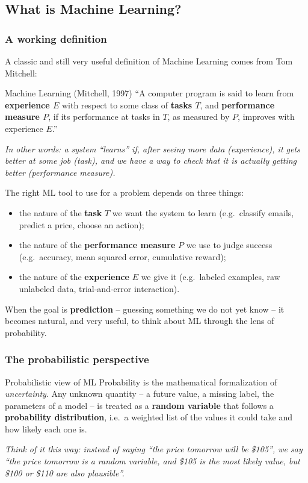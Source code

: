 \subsection{What is Machine Learning?}\label{sec:rl-intro-what-is-ml}

\subsubsection{A working definition}

A classic and still very useful definition of Machine Learning comes from Tom Mitchell:

\begin{defbox}{Machine Learning (Mitchell, 1997)}
``A computer program is said to learn from \textbf{experience $E$} with respect to some class of \textbf{tasks $T$}, and \textbf{performance measure $P$}, if its performance at tasks in $T$, as measured by $P$, improves with experience $E$.''

\textit{In other words: a system ``learns'' if, after seeing more data (experience), it gets better at some job (task), and we have a way to check that it is actually getting better (performance measure).}
\end{defbox}

The right ML tool to use for a problem depends on three things:
\begin{itemize}
  \item the nature of the \textbf{task} $T$ we want the system to learn (e.g.\ classify emails, predict a price, choose an action);
  \item the nature of the \textbf{performance measure} $P$ we use to judge success (e.g.\ accuracy, mean squared error, cumulative reward);
  \item the nature of the \textbf{experience} $E$ we give it (e.g.\ labeled examples, raw unlabeled data, trial-and-error interaction).
\end{itemize}

When the goal is \textbf{prediction} -- guessing something we do not yet know -- it becomes natural, and very useful, to think about ML through the lens of probability.

\subsubsection{The probabilistic perspective}

\begin{defbox}{Probabilistic view of ML}
Probability is the mathematical formalization of \textit{uncertainty}. Any unknown quantity -- a future value, a missing label, the parameters of a model -- is treated as a \textbf{random variable} that follows a \textbf{probability distribution}, i.e.\ a weighted list of the values it could take and how likely each one is.

\textit{Think of it this way: instead of saying ``the price tomorrow will be \$105'', we say ``the price tomorrow is a random variable, and \$105 is the most likely value, but \$100 or \$110 are also plausible''.}
\end{defbox}


